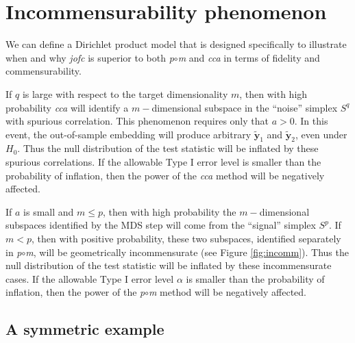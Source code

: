 \documentclass[12pt,oneside,final]{thesis}\usepackage[]{graphicx}\usepackage[]{color}
\begin{document}
\section{Incommensurability phenomenon}

 We can define a Dirichlet product model
that is designed specifically to illustrate when and why {\em jofc} is superior to both {\it p}$\circ${\it m} and {\em cca}
in terms of fidelity and commensurability.

If $q$ is large with respect to the target dimensionality $m$,
then with high probability {\em cca} will identify a $m-$dimensional subspace in the ``noise'' simplex $S^q$ with spurious correlation.
This phenomenon requires only that $a>0$.
In this event, the out-of-sample embedding will produce arbitrary $\widetilde{\bm{y}}_1$ and $\widetilde{\bm{y}}_2$,
even under $H_0$.
Thus the null distribution of the test statistic will be inflated by these spurious correlations.
If the allowable Type I error level is smaller than the probability of inflation,
then the power of the {\em cca} method will be negatively affected.

If $a$ is small and $m \leq p$, then with high probability the $m-$dimensional subspaces identified by the MDS step
will come from the ``signal'' simplex $S^p$.
If $m<p$, then with positive probability, these two subspaces,
identified separately in {\it p}$\circ${\it m},
will be geometrically incommensurate (see Figure \ref{fig:incomm}).
Thus the null distribution of the test statistic will be inflated by these incommensurate cases.
If the allowable Type I error level $\alpha$ is smaller than the probability of inflation,
then the power of the {\it p}$\circ${\it m} method will be negatively affected.


\subsection{ A symmetric example}
\end{document}
